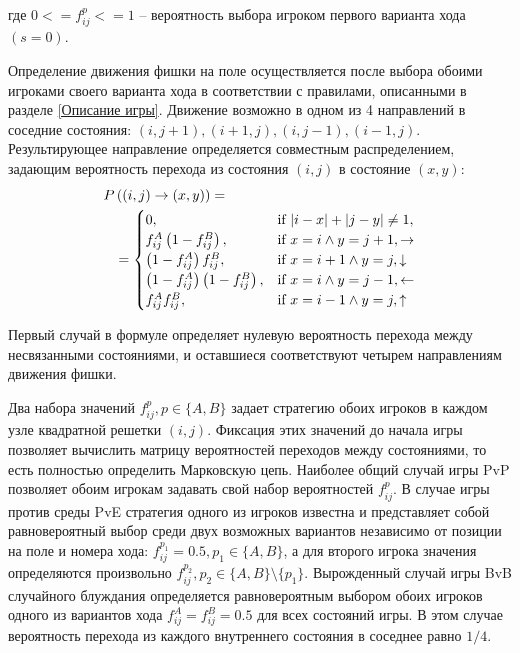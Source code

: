 где $0 <= f_{ij}^p <= 1$ -- вероятность выбора игроком первого варианта хода $(s=0)$.

Определение движения фишки на поле осуществляется после выбора обоими игроками своего варианта хода в соответствии с правилами,
описанными в разделе \cref{Описание игры}. Движение возможно в одном из 4 направлений в соседние состояния:
$(i, j + 1), (i + 1, j), (i, j - 1), (i - 1, j)$. Результирующее направление определяется совместным распределением, 
задающим вероятность перехода из состояния $(i, j)$ в состояние $(x, y)$:
\begin{equation}
    \begin{aligned}
    P& \left( (i, j) \rightarrow (x, y) \right) = \\
    &=\begin{cases}
        0, &\mbox{if } |i-x|+|j-y| \neq 1,\\ 
        f_{ij}^A \left(1-f_{ij}^B\right), &\mbox{if } x=i \land y=j+1, {\bf \rightarrow}\\
        \left(1-f_{ij}^A\right) f_{ij}^B, &\mbox{if } x=i+1 \land y=j, {\bf \downarrow}\\
        \left(1-f_{ij}^A\right) \left(1-f_{ij}^B\right), &\mbox{if } x=i \land y=j-1, {\bf \leftarrow}\\
        f_{ij}^A f_{ij}^B, &\mbox{if } x=i-1 \land y=j, {\bf \uparrow}\\
    \end{cases}
    \label{eq:transition}
    \end{aligned}
\end{equation}

Первый случай в формуле определяет нулевую вероятность перехода между несвязанными состояниями, и оставшиеся соответствуют четырем направлениям движения фишки.

Два набора значений $f_{ij}^p, p \in \{A, B\}$ задает стратегию обоих игроков в каждом узле квадратной решетки $(i, j)$. 
Фиксация этих значений до начала игры позволяет вычислить матрицу вероятностей переходов между состояниями, то есть полностью определить Марковскую цепь.
Наиболее общий случай игры PvP позволяет обоим игрокам задавать свой набор вероятностей $f_{ij}^p$. В случае игры против среды PvE
стратегия одного из игроков известна и представляет собой равновероятный выбор среди двух возможных вариантов независимо от позиции на поле и номера хода:
$f_{ij}^{p_1} = 0.5, p_1 \in \{A, B\}$, а для второго игрока значения определяются произвольно $f_{ij}^{p_2}, p_2 \in \{A, B\} \setminus \{p_1\}$. 
Вырожденный случай игры BvB случайного блуждания определяется равновероятным выбором обоих игроков одного из вариантов хода $f_{ij}^{A} = f_{ij}^{B} = 0.5$
для всех состояний игры. В этом случае вероятность перехода из каждого внутреннего состояния в соседнее равно $1/4$.

